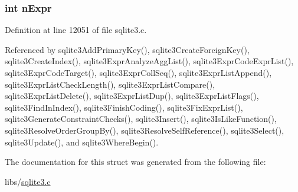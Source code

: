 \subsubsection[{n\+Expr}]{\setlength{\rightskip}{0pt plus 5cm}int n\+Expr}\label{struct_expr_list_a1ca01ae801531fe9c5245a9e551b182b}


Definition at line 12051 of file sqlite3.\+c.



Referenced by sqlite3\+Add\+Primary\+Key(), sqlite3\+Create\+Foreign\+Key(), sqlite3\+Create\+Index(), sqlite3\+Expr\+Analyze\+Agg\+List(), sqlite3\+Expr\+Code\+Expr\+List(), sqlite3\+Expr\+Code\+Target(), sqlite3\+Expr\+Coll\+Seq(), sqlite3\+Expr\+List\+Append(), sqlite3\+Expr\+List\+Check\+Length(), sqlite3\+Expr\+List\+Compare(), sqlite3\+Expr\+List\+Delete(), sqlite3\+Expr\+List\+Dup(), sqlite3\+Expr\+List\+Flags(), sqlite3\+Find\+In\+Index(), sqlite3\+Finish\+Coding(), sqlite3\+Fix\+Expr\+List(), sqlite3\+Generate\+Constraint\+Checks(), sqlite3\+Insert(), sqlite3\+Is\+Like\+Function(), sqlite3\+Resolve\+Order\+Group\+By(), sqlite3\+Resolve\+Self\+Reference(), sqlite3\+Select(), sqlite3\+Update(), and sqlite3\+Where\+Begin().



The documentation for this struct was generated from the following file\+:\begin{DoxyCompactItemize}
\item 
libs/\hyperlink{sqlite3_8c}{sqlite3.\+c}\end{DoxyCompactItemize}
